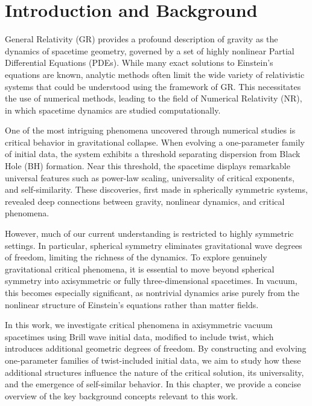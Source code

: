 \chapter{Introduction and Background}
General Relativity (GR) provides a profound description of gravity as the dynamics of spacetime geometry, governed by a set of highly nonlinear Partial Differential Equations (PDEs). While many exact solutions to Einstein's equations are known, analytic methods often limit the wide variety of relativistic systems that could be understood using the framework of GR. This necessitates the use of numerical methods, leading to the field of Numerical Relativity (NR), in which spacetime dynamics are studied computationally.

One of the most intriguing phenomena uncovered through numerical studies is critical behavior in gravitational collapse. When evolving a one-parameter family of initial data, the system exhibits a threshold separating dispersion from Black Hole (BH) formation. Near this threshold, the spacetime displays remarkable universal features such as power-law scaling, universality of critical exponents, and self-similarity. These discoveries, first made in spherically symmetric systems, revealed deep connections between gravity, nonlinear dynamics, and critical phenomena.

However, much of our current understanding is restricted to highly symmetric settings. In particular, spherical symmetry eliminates gravitational wave degrees of freedom, limiting the richness of the dynamics. To explore genuinely gravitational critical phenomena, it is essential to move beyond spherical symmetry into axisymmetric or fully three-dimensional spacetimes. In vacuum, this becomes especially significant, as nontrivial dynamics arise purely from the nonlinear structure of Einstein's equations rather than matter fields.

In this work, we investigate critical phenomena in axisymmetric vacuum spacetimes using Brill wave initial data, modified to include twist, which introduces additional geometric degrees of freedom. By constructing and evolving one-parameter families of twist-included initial data, we aim to study how these additional structures influence the nature of the critical solution, its universality, and the emergence of self-similar behavior. In this chapter, we provide a concise overview of the key background concepts relevant to this work.


